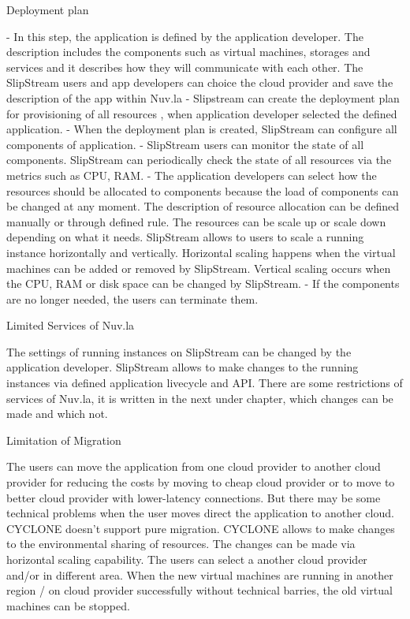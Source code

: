 Deployment plan 


-	In this step, the application is defined by the application developer. The description includes the components such as virtual machines, storages and services and it describes how they will communicate with each other. The SlipStream users and app developers can choice the cloud provider and save the description of the app within Nuv.la
-	Slipstream can create the deployment plan for provisioning of all resources , when application developer selected the defined application. 
-	When the deployment plan is created, SlipStream can configure all components of application.
-	SlipStream users can monitor the state of all components. SlipStream can periodically check the state of all resources via the metrics such as CPU, RAM. 
-	The application developers can select how the resources should be allocated to components because the load of components can be changed at any moment. The description of resource allocation can be defined manually or through defined rule. The resources can be scale up or scale down depending on what it needs. SlipStream allows to users to scale a running instance horizontally and vertically. Horizontal scaling happens when the virtual machines can be added or removed by SlipStream.  Vertical scaling occurs when the CPU, RAM or disk space can be changed by SlipStream. 
-	If the components are no longer needed, the users can terminate them. 


Limited Services of Nuv.la

The settings of running instances on SlipStream can be changed by the application developer. SlipStream allows to make changes to the running instances via defined application livecycle and API. There are some restrictions of services of Nuv.la, it is written in the next under chapter, which changes can be made and which not. 

Limitation of Migration

The users can  move the application from one cloud provider to another cloud provider for reducing the costs by moving to cheap cloud provider or to move to better cloud provider with lower-latency connections. But  there may be some technical problems when the user moves direct the application to another cloud. CYCLONE doesn’t support pure migration. CYCLONE  allows to make changes to the environmental sharing of resources. The changes can be made via horizontal scaling capability. The users can select a another cloud provider and/or in different area. When the new virtual machines are running in another region / on cloud provider successfully without technical barries, the old virtual machines can be stopped.

